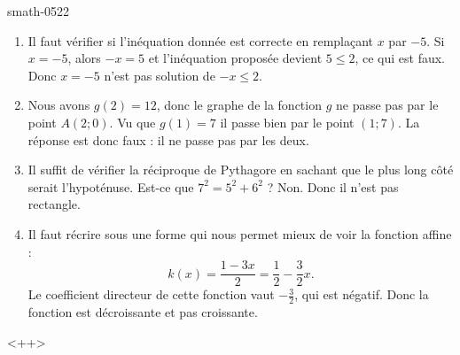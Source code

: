 
\begin{corrige}{smath-0522}

    \begin{enumerate}
        \item
            Il faut vérifier si l'inéquation donnée est correcte en remplaçant \( x\) par \( -5\). Si \( x=-5\), alors \( -x=5\) et l'inéquation proposée devient \( 5\leq 2\), ce qui est faux. Donc \( x=-5\) n'est pas solution de \( -x\leq 2\).

        \item
            Nous avons \( g(2)=12\), donc le graphe de la fonction \( g\) ne passe pas par le point \( A(2;0)\). Vu que \( g(1)=7\) il passe bien par le point \( (1;7)\). La réponse est donc faux : il ne passe pas par les deux.
        \item
            Il suffit de vérifier la réciproque de Pythagore en sachant que le plus long côté serait l'hypoténuse. Est-ce que \( 7^2=5^2+6^2\) ? Non. Donc il n'est pas rectangle.
        \item
            Il faut récrire sous une forme qui nous permet mieux de voir la fonction affine :
            \begin{equation}
                k(x)=\frac{ 1-3x }{ 2 }=\frac{ 1 }{2}-\frac{ 3 }{2}x.
            \end{equation}
            Le coefficient directeur de cette fonction vaut \( -\frac{ 3 }{2}\), qui est négatif. Donc la fonction est décroissante et pas croissante. 
    \end{enumerate}
    <++>

\end{corrige}
